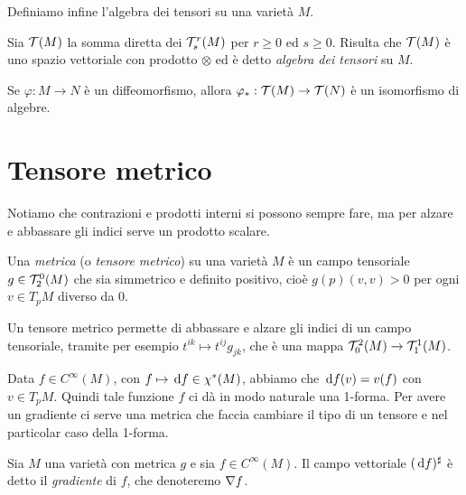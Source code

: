 Definiamo infine l'algebra dei tensori su una varietà $M$.
\begin{definition} 
	Sia $\mathcal T(M)$ la somma diretta dei $\mathcal T_s^r(M)$ per $r\ge 0$ ed $s\ge 0$. Risulta che $\mathcal T(M)$ è uno spazio vettoriale con prodotto $\otimes$ ed è detto \emph{algebra dei tensori} su $M$.
\end{definition}

\begin{remark}
Se $\varphi:M\to N$ è un diffeomorfismo, allora $\varphi_*: \mathcal T(M) \to \mathcal T(N)$ è un isomorfismo di algebre.
\end{remark}

\section{Tensore metrico}

Notiamo che contrazioni e prodotti interni si possono sempre fare, ma per alzare e abbassare gli indici serve un prodotto scalare.

\begin{definition}  
	Una \emph{metrica} (o \emph{tensore metrico}) su una varietà $M$ è un campo tensoriale $g \in \mathcal T_2^0(M)$ che sia simmetrico e definito positivo, cioè $g(p)(v,v)>0$ per ogni $v\in T_pM$ diverso da 0.
\end{definition}

Un tensore metrico permette di abbassare e alzare gli indici di un campo tensoriale, tramite per esempio $t^{ik} \mapsto t^{ij}g_{jk}$, che è una mappa $\mathcal T_0^2(M) \to \mathcal T_1^1(M)$.

Data $f\in C^\infty(M)$, con $f \mapsto \,\mathrm d f \in \chi^*(M)$, abbiamo che $\,\mathrm d f(v) = v(f)$ con $v \in T_pM$. Quindi tale funzione $f$ ci dà in modo naturale una 1-forma.
Per avere un gradiente ci serve una metrica che faccia cambiare il tipo di un tensore e nel particolar caso della 1-forma. %

\begin{definition} 
	Sia $M$ una varietà con metrica $g$ e sia $f \in C^\infty(M)$. Il campo vettoriale $(\,\mathrm d f)^\sharp$ è detto il \emph{gradiente} di $f$, che denoteremo $\nabla f$. %
\end{definition}

